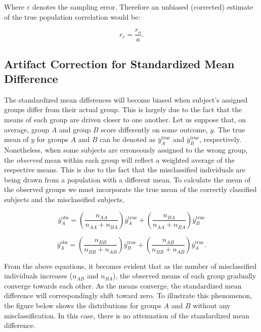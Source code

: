 \documentclass[
  letterpaper,
  DIV=11,
  numbers=noendperiod]{scrreprt}
\begin{document}
Where \(\varepsilon\) denotes the sampling error. Therefore an unbiased
(corrected) estimate of the true population correlation would be:

\[
r_c = \frac{r_o}{a}.
\]

\hypertarget{artifact-correction-for-standardized-mean-difference}{%
\subsection{Artifact Correction for Standardized Mean
Difference}\label{artifact-correction-for-standardized-mean-difference}}

The standardized mean differences will become biased when subject's
assigned groups differ from their actual group. This is largely due to
the fact that the means of each group are driven closer to one another.
Let us suppose that, on average, group \(A\) and group \(B\) score
differently on some outcome, \(y\). The true mean of \(y\) for groups
\(A\) and \(B\) can be denoted as \(\bar{y}^\text{true}_{A}\) and
\(\bar{y}^\text{true}_{B}\), respectively. Nonetheless, when some
subjects are erroneously assigned to the wrong group, the
\emph{observed} mean within each group will reflect a weighted average
of the respective means. This is due to the fact that the misclassified
individuals are being drawn from a population with a different mean. To
calculate the mean of the observed groups we must incorporate the true
mean of the correctly classified subjects and the misclassified
subjects,

\[
\bar{y}^\text{obs}_A = \left(\frac{n_{AA}}{n_{AA}+n_{BA}}\right)\bar{y}^\text{true}_A + \left(\frac{n_{BA}}{n_{AA}+n_{BA}}\right)\bar{y}^\text{true}_B
\]

\[
\bar{y}^\text{obs}_A = \left(\frac{n_{BB}}{n_{BB}+n_{AB}}\right)\bar{y}^\text{true}_B + \left(\frac{n_{AB}}{n_{BB}+n_{AB}}\right)\bar{y}^\text{true}_A.
\]

From the above equations, it becomes evident that as the number of
misclassified individuals increases (\(n_{AB}\) and \(n_{BA}\)), the
observed means of each group gradually converge towards each other. As
the means converge, the standardized mean difference will
correspondingly shift toward zero. To illustrate this phenomenon, the
figure below shows the distributions for groups \(A\) and \(B\) without
any misclassification. In this case, there is no attenuation of the
standardized mean difference.
\end{document}
